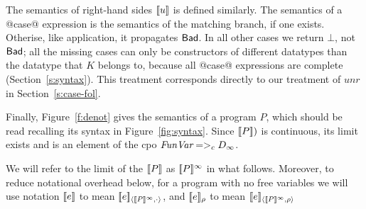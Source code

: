 The semantics of right-hand sides $[\![u]\!]$ is defined similarly.  The 
semantics of a @case@ expression is the semantics of the matching branch,
if one exists. Otherise, like application, it propagates $\mathsf{Bad}$.
In all other cases we return $\bot$, not $\mathsf{Bad}$; 
all the missing cases can only be constructors
of different datatypes than the datatype that $K$ belongs to, because
all @case@ expressions are complete (Section~\ref{s:syntax}).
This treatment corresponds directly to our treatment of $unr$ in Section~\ref{s:case-fol}.

Finally, Figure~\ref{f:denot} gives the semantics of a program $P$, which should
be read recalling its syntax in Figure~\ref{fig:syntax}.
Since $[\![P]\!])$ is continuous, its limit exists and is an element of the 
cpo $\textit{FunVar} =>_c D_{\infty}$.

\begin{definition}
We will refer to the limit of the $[\![P]\!]$ as $[\![P]\!]^{\infty}$ in what follows. 
Moreover, to reduce notational overhead below, for a program with no free variables we 
will use notation $[\![e]\!]$ to mean $[\![e]\!]_{\langle {[\![P]\!]^\infty},{\cdot}\rangle}$, and
$[\![e]\!]_\rho$ to mean $[\![e]\!]_{\langle {[\![P]\!]^\infty},{\rho}\rangle}$
\end{definition}

